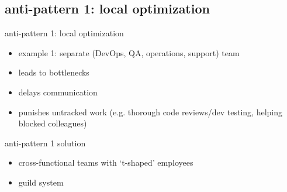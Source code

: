 \documentclass{beamer}
\begin{document}
	\subsection{anti-pattern 1: local optimization}
	\begin{frame}{anti-pattern 1: local optimization}
		\begin{itemize}
			\item example 1: separate (DevOps, QA, operations, support) team \pause
			\item leads to bottlenecks \pause
			\item delays communication \pause
			\item punishes untracked work (e.g. thorough code reviews/dev testing, helping blocked colleagues)
		\end{itemize}
	\end{frame}
	\begin{frame}{anti-pattern 1 solution}
		\begin{itemize}
			\item cross-functional teams with `t-shaped' employees \pause
			\item guild system 
		\end{itemize}
	\end{frame}
\end{document}
